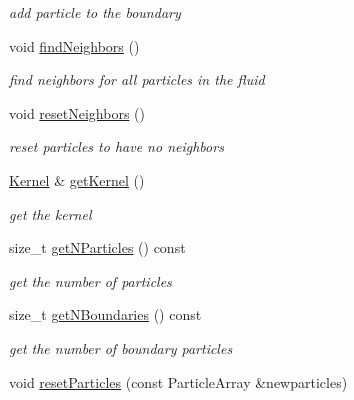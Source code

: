 \begin{DoxyCompactItemize}
\begin{DoxyCompactList}\small\item\em add particle to the boundary \end{DoxyCompactList}\item 
\hypertarget{classFluid_a55230ad05ce44fc00032547393788796}{void \hyperlink{classFluid_a55230ad05ce44fc00032547393788796}{find\-Neighbors} ()}\label{classFluid_a55230ad05ce44fc00032547393788796}

\begin{DoxyCompactList}\small\item\em find neighbors for all particles in the fluid \end{DoxyCompactList}\item 
\hypertarget{classFluid_a6f1fc57fb0aa2de6c81134f02c1a82ce}{void \hyperlink{classFluid_a6f1fc57fb0aa2de6c81134f02c1a82ce}{reset\-Neighbors} ()}\label{classFluid_a6f1fc57fb0aa2de6c81134f02c1a82ce}

\begin{DoxyCompactList}\small\item\em reset particles to have no neighbors \end{DoxyCompactList}\item 
\hypertarget{classFluid_afb89fa53b31cbd8a053fea20779f7fc0}{\hyperlink{classKernel}{\-Kernel} \& \hyperlink{classFluid_afb89fa53b31cbd8a053fea20779f7fc0}{get\-Kernel} ()}\label{classFluid_afb89fa53b31cbd8a053fea20779f7fc0}

\begin{DoxyCompactList}\small\item\em get the kernel \end{DoxyCompactList}\item 
\hypertarget{classFluid_a01a17b69aaea73239a3f13f191dbd48a}{size\-\_\-t \hyperlink{classFluid_a01a17b69aaea73239a3f13f191dbd48a}{get\-N\-Particles} () const }\label{classFluid_a01a17b69aaea73239a3f13f191dbd48a}

\begin{DoxyCompactList}\small\item\em get the number of particles \end{DoxyCompactList}\item 
\hypertarget{classFluid_aad2f8ee1598445f42f41e7faf1fd9a09}{size\-\_\-t \hyperlink{classFluid_aad2f8ee1598445f42f41e7faf1fd9a09}{get\-N\-Boundaries} () const }\label{classFluid_aad2f8ee1598445f42f41e7faf1fd9a09}

\begin{DoxyCompactList}\small\item\em get the number of boundary particles \end{DoxyCompactList}\item 
\hypertarget{classFluid_a1f422a0a94dc16192650ea11db416576}{void \hyperlink{classFluid_a1f422a0a94dc16192650ea11db416576}{reset\-Particles} (const \-Particle\-Array \&newparticles)}\label{classFluid_a1f422a0a94dc16192650ea11db416576}


\end{DoxyCompactItemize}

